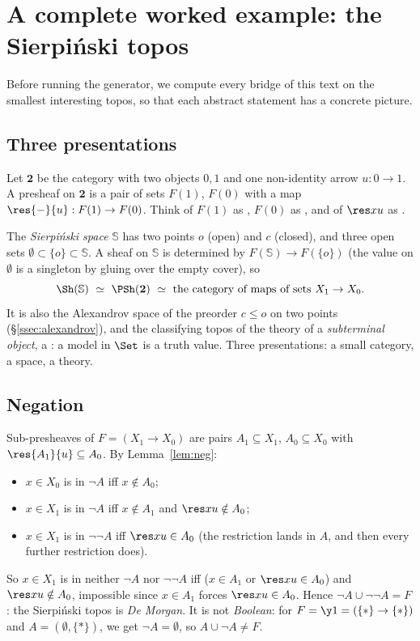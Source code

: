 \section{A complete worked example: the Sierpiński topos}\label{sec:sierpinski}

Before running the generator, we compute every bridge of this text on the smallest interesting topos, so that each abstract statement has a concrete picture.

\subsection{Three presentations}

Let $\mathbf 2$ be the category with two objects $0,1$ and one non-identity arrow $u : 0\to 1$. A presheaf on $\mathbf 2$ is a pair of sets $F(1)$, $F(0)$ with a map $\res{-}{u} : F(1)\to F(0)$. Think of $F(1)$ as , $F(0)$ as , and of $\res xu$ as .

The \emph{Sierpiński space} $\mathbb S$ has two points $o$ (open) and $c$ (closed), and three open sets $\emptyset\subset\{o\}\subset\mathbb S$. A sheaf on $\mathbb S$ is determined by $F(\mathbb S)\to F(\{o\})$ (the value on $\emptyset$ is a singleton by gluing over the empty cover), so
\[
\Sh(\mathbb S)\ \simeq\ \PSh(\mathbf 2)\ \simeq\ \text{the category of maps of sets }X_1\to X_0.
\]
It is also the Alexandrov space of the preorder $c\le o$ on two points (\S\ref{ssec:alexandrov}), and the classifying topos of the theory of a \emph{subterminal object}, a : a model in $\Set$ is a truth value. Three presentations: a small category, a space, a theory.

\subsection{Negation}

Sub-presheaves of $F = (X_1\to X_0)$ are pairs $A_1\subseteq X_1$, $A_0\subseteq X_0$ with $\res{A_1}{u}\subseteq A_0$. By Lemma~\ref{lem:neg}:
\begin{itemize}
\item $x\in X_0$ is in $\neg A$ iff $x\notin A_0$;
\item $x\in X_1$ is in $\neg A$ iff $x\notin A_1$ and $\res xu\notin A_0$;
\item $x\in X_1$ is in $\neg\neg A$ iff $\res xu\in A_0$ (the restriction lands in $A$, and then every further restriction does).
\end{itemize}
So $x\in X_1$ is in neither $\neg A$ nor $\neg\neg A$ iff ($x\in A_1$ or $\res xu\in A_0$) and $\res xu\notin A_0$, impossible since $x\in A_1$ forces $\res xu\in A_0$. Hence $\neg A\cup\neg\neg A = F$: the Sierpiński topos is \emph{De Morgan}. It is not \emph{Boolean}: for $F = \y 1 = (\{\ast\}\to\{\ast\})$ and $A = (\emptyset,\{\ast\})$, we get $\neg A = \emptyset$, so $A\cup\neg A\neq F$.


